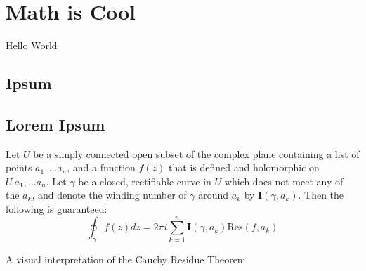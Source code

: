\documentclass{./scibookneue-print}
\begin{document}
\tableofcontents
\chapter{Math is Cool}
Hello World \lipsum[1-8]
\section{Ipsum}

\lipsum[1]
\lipsum[2]
\lipsum[3]

\lipsum[1]
\lipsum[2]
\lipsum[3]

\lipsum[1]


\lipsum[2]
\lipsum[3]

\section{Lorem Ipsum}
\lipsum[1]
\begin{mthm}
Let $U$ be a simply connected open subset of the complex plane containing a list of points $a_1, ... a_n$, 
and a function $f(z)$ that is defined and holomorphic on $U \ {a_1,\ldots a_n}$.
Let $\gamma$ be a closed, rectifiable curve in $U$ which does not meet any of the $a_k$, 
and denote the winding number of $\gamma$ around $a_k$ by $\mathbf{I}(\gamma, a_k)$.
Then the following is guaranteed:
\begin{equation}
	\oint_\gamma f(z) dz = 2\pi i \sum_{k=1} ^n \mathbf{I}(\gamma, a_k) \mathrm{Res}\left(f,a_k\right)
\end{equation}
\end{mthm}


\begin{mproof}
	\lipsum[5]
\end{mproof}
\medskip
\begin{center}

	\medskip
	\footnotesize{\sffamily A visual interpretation of the Cauchy Residue Theorem}
\end{center}
\lipsum[1]
\end{document}
